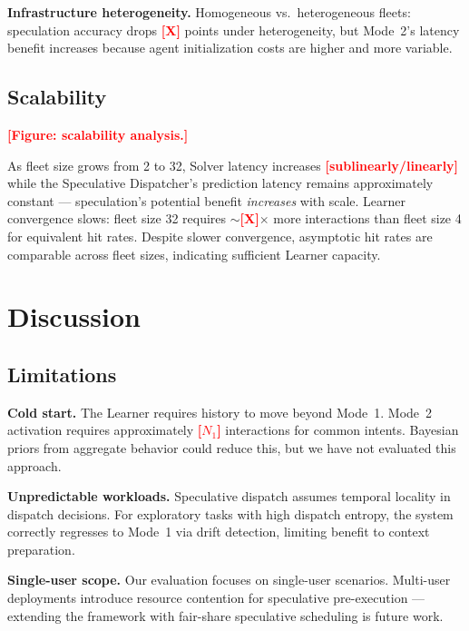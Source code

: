 \documentclass[conference,10pt]{IEEEtran}
\newcommand{\placeholder}[1]{\textcolor{red}{\textbf{[#1]}}}
\begin{document}
\textbf{Infrastructure heterogeneity.} Homogeneous vs.\ heterogeneous fleets: speculation accuracy drops \placeholder{X} points under heterogeneity, but Mode~2's latency benefit increases because agent initialization costs are higher and more variable.

\subsection{Scalability}

\placeholder{Figure: scalability analysis.}

As fleet size grows from 2 to 32, Solver latency increases \placeholder{sublinearly/linearly} while the Speculative Dispatcher's prediction latency remains approximately constant --- speculation's potential benefit \emph{increases} with scale.
Learner convergence slows: fleet size 32 requires ${\sim}$\placeholder{X}$\times$ more interactions than fleet size 4 for equivalent hit rates.
Despite slower convergence, asymptotic hit rates are comparable across fleet sizes, indicating sufficient Learner capacity.



\section{Discussion}
\label{sec:discussion}

\subsection{Limitations}

\textbf{Cold start.}
The Learner requires history to move beyond Mode~1.
Mode~2 activation requires approximately \placeholder{$N_1$} interactions for common intents.
Bayesian priors from aggregate behavior could reduce this, but we have not evaluated this approach.

\textbf{Unpredictable workloads.}
Speculative dispatch assumes temporal locality in dispatch decisions.
For exploratory tasks with high dispatch entropy, the system correctly regresses to Mode~1 via drift detection, limiting benefit to context preparation.

\textbf{Single-user scope.}
Our evaluation focuses on single-user scenarios.
Multi-user deployments introduce resource contention for speculative pre-execution --- extending the framework with fair-share speculative scheduling is future work.
\end{document}

